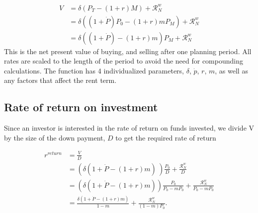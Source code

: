 \begin{align}
V &= \delta \left(P_T - (1+r)M\right) +   \mathcal{R}^w_N   \\
&= \delta \left((1+\dot P) P_0 - (1+r)mP_M\right)  +      \mathcal{R}^w_N \\
  &= \delta \left((1+\dot P)    - (1+r)m    \right) P_M + \mathcal{R}^w_N 
\end{align}
This is the net present value of buying, and selling after one planning period. All rates are scaled to the length of the period to avoid the need for compounding calculations. The function has 4 individualized  parameters, $\delta$, $\dot p$, $r$, $m$, as well as any factors that affect the rent term.


\subsection{Rate of return on investment}
Since an investor is interested in the rate of return on funds invested, we divide V by the size of the down payment, $D$ to get the required rate of return  

\begin{align}
r^{return} 
  &= \frac{V}{D}  \nonumber \\
  &= \left(\delta \left(1+\dot P - (1+r)m\right) \ \right) \frac{P_0}{D}  + \frac{\mathcal{R}^w_N }{D}      \nonumber \\
  &= \left(\delta \left(1+\dot P - (1+r)m\right)  \right) \frac{P_0}{P_0-mP_0} +  \frac{\mathcal{R}^w_N }{P_0-mP_0}  \\ 
  &= \frac{\delta \left(1+\dot P - (1+r)m\right) }{1-m} +\frac{\mathcal{R}^w_N }{(1-m)P_0}.
\label{eqn-property-investment-return1}
\end{align}


